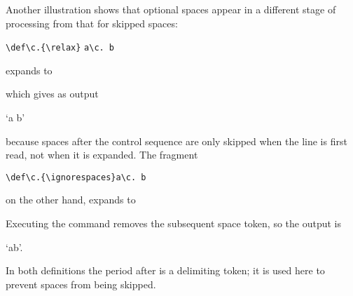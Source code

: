 \documentclass{book}
\begin{document}
Another illustration shows that optional spaces appear in a different
stage of processing from that for skipped spaces:
\begin{disp}\verb>\def\c.{\relax}>\nl
     \verb>a\c.>{\tt{} b}\end{disp}
expands to
\begin{disp}\end{disp}
which gives as output\begin{disp} `a b'\end{disp}
because spaces after the  control sequence are only
skipped when the line is first read, not when it is expanded.
The fragment
\begin{disp} \verb-\def\c.{\ignorespaces}-\nl \verb-a\c. b-\end{disp}
on the other hand, expands to
\begin{disp}\end{disp}
Executing the  command removes the subsequent
space token, so the output is \begin{disp} `ab'.\end{disp}
In both definitions
the period after  is a delimiting token; it is used here
to prevent spaces from being skipped.
\end{document}
